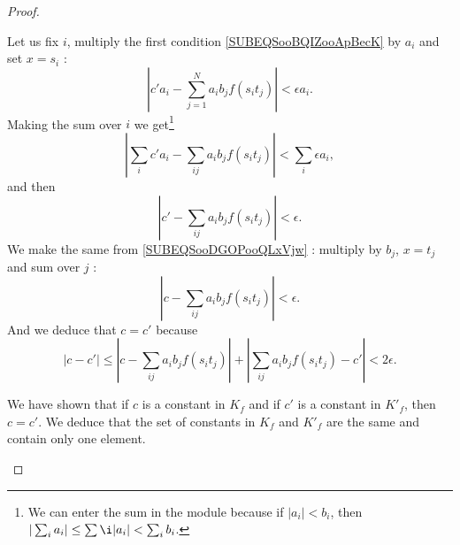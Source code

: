 \begin{proof}
\begin{subproof}
		Let us fix \( i\), multiply the first condition \eqref{SUBEQSooBQIZooApBecK} by \( a_i\) and set \( x=s_i\) :
		\begin{equation}
			| c'a_i-\sum_{j=1}^Na_ib_jf(s_it_j) |<\epsilon a_i.
		\end{equation}
		Making the sum over \( i\) we get\footnote{We can enter the sum in the module because if \( | a_i |<b_i\), then \( | \sum_ia_i |\leq \sum\i| a_i |<\sum_i b_i\).}
		\begin{equation}
			| \sum_ic'a_i-\sum_{ij}a_ib_jf(s_it_j) |<\sum_i\epsilon a_i,
		\end{equation}
		and then
		\begin{equation}
			| c'-\sum_{ij}a_ib_jf(s_it_j) |<\epsilon.
		\end{equation}
		We make the same from \eqref{SUBEQSooDGOPooQLxVjw} : multiply by \( b_j\), \( x=t_j\) and sum over \( j\) :
		\begin{equation}
			| c-\sum_{ij}a_ib_jf(s_it_j) |<\epsilon.
		\end{equation}
		And we deduce that \( c=c'\) because
		\begin{equation}
			| c-c' |\leq | c-\sum_{ij}a_ib_jf(s_it_j) |+| \sum_{ij}a_ib_jf(s_it_j)-c' |<2\epsilon.
		\end{equation}

		We have shown that if \( c\) is a constant in \( K_f\) and if \( c'\) is a constant in \( K'_f\), then \( c=c'\). We deduce that the set of constants in \( K_f\) and \( K'_f\) are the same and contain only one element.


\end{subproof}
\end{proof}
